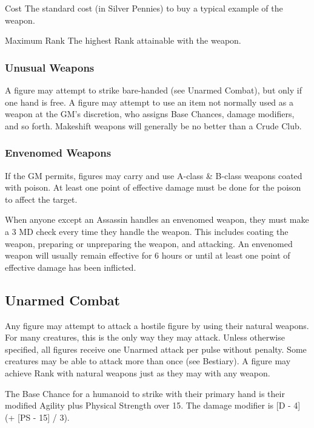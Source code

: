 \begin{multicols*}{3}
\begin{Description}
\item[Cost] The standard cost (in Silver Pennies) to buy a typical
example of the weapon.

\item[Maximum Rank] The highest Rank attainable with the weapon.

\end{Description}

\subsubsection{Unusual Weapons}

A figure may attempt to strike bare-handed (see Unarmed Combat), but
only if one hand is free. A figure may attempt to use an item not
normally used as a weapon at the GM's discretion, who assigns Base
Chances, damage modifiers, and so forth. Makeshift weapons will
generally be no better than a Crude Club.

\subsubsection{Envenomed Weapons}

If the GM permits, figures may carry and use A-class \& B-class
weapons coated with poison. At least one point of effective damage
must be done for the poison to affect the target.

When anyone except an Assassin handles an envenomed weapon, they must
make a 3 \x MD check every time they handle the weapon. This includes
coating the weapon, preparing or unpreparing the weapon, and
attacking. An envenomed weapon will usually remain effective for 6
hours or until at least one point of effective damage has been
inflicted.

\subsection{Unarmed Combat}
\label{combat:unarmed}

Any figure may attempt to attack a hostile figure by using their
natural weapons. For many creatures, this is the only way they may
attack. Unless otherwise specified, all figures receive one Unarmed
attack per pulse without penalty. Some creatures may be able to attack
more than once (see Bestiary). A figure may achieve Rank with natural
weapons just as they may with any weapon.

The Base Chance for a humanoid to strike with their primary hand is
their modified Agility  plus Physical Strength over 15. The damage
modifier is [D - 4] (+ [PS - 15] / 3).


\end{multicols*}
